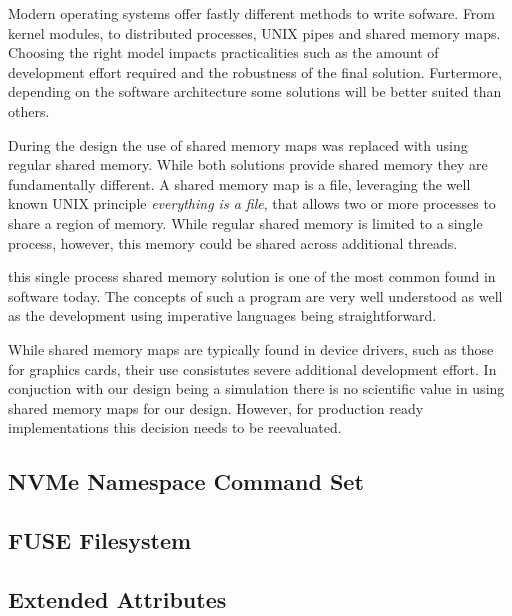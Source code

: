 Modern operating systems offer fastly different methods to write sofware. From
kernel modules, to distributed processes, UNIX pipes and shared memory maps.
Choosing the right model impacts practicalities such as the amount of
development effort required and the robustness of the final solution. 
Furtermore, depending on the software architecture some solutions will be better
suited than others.

During the design the use of shared memory maps was replaced with using regular
shared memory. While both solutions provide shared memory they are fundamentally
different. A shared memory map is a file, leveraging the well known UNIX
principle \textit{everything is a file}, that allows two or more processes to
share a region of memory. While regular shared memory is limited to a single
process, however, this memory could be shared across additional threads.

this single process shared memory solution is one of the most common found in
software today. The concepts of such a program are very well understood as
well as the development using imperative languages being straightforward.

While shared memory maps are typically found in device drivers, such as those
for graphics cards, their use consistutes severe additional development effort.
In conjuction with our design being a simulation there is no scientific value in
using shared memory maps for our design. However, for production ready
implementations this decision needs to be reevaluated.

\subsection{NVMe Namespace Command Set}

\subsection{FUSE Filesystem}


\subsection{Extended Attributes}


